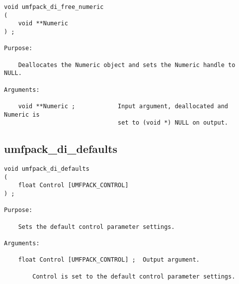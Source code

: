 \documentclass[11pt]{article}
\begin{document}
{\footnotesize
\begin{verbatim}
void umfpack_di_free_numeric
(
    void **Numeric
) ;

Purpose:

    Deallocates the Numeric object and sets the Numeric handle to NULL.

Arguments:

    void **Numeric ;            Input argument, deallocated and Numeric is
                                set to (void *) NULL on output.
\end{verbatim}
}

\subsection{umfpack\_di\_defaults}

{\footnotesize
\begin{verbatim}
void umfpack_di_defaults
(
    float Control [UMFPACK_CONTROL]
) ;

Purpose:

    Sets the default control parameter settings.

Arguments:

    float Control [UMFPACK_CONTROL] ;  Output argument.

        Control is set to the default control parameter settings.
\end{verbatim}
}
\end{document}
